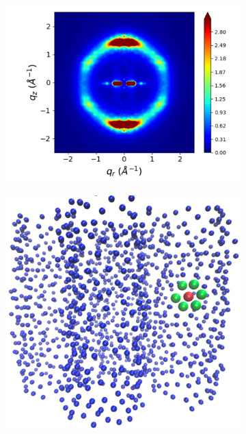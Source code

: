\documentclass[journal=jpcbfk,manuscript=article]{achemso}
\begin{document}
\begin{figure}[!htb]
\begin{subfigure}{0.32\linewidth}
    \caption{}\label{fig:tilt}
  \end{subfigure}
  \begin{subfigure}{0.32\linewidth}
	\centering
	\includegraphics[width=\textwidth]{tails_rzplot_jet.pdf}
	\caption{}\label{fig:tails_rzplot}
  \end{subfigure}
  \begin{subfigure}[t]{0.32\linewidth}
    \centering
	\includegraphics[scale=0.2]{centroids.pdf}

\end{subfigure}
\end{figure}
\end{document}
